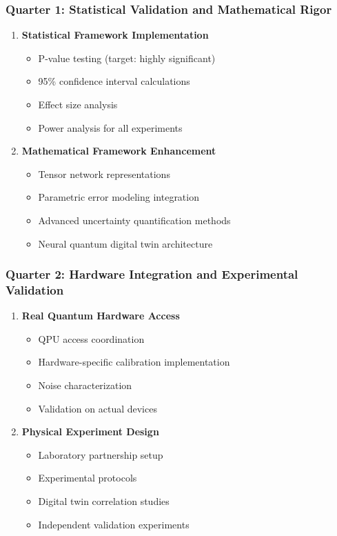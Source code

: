 \documentclass[12pt,a4paper]{article}
\begin{document}
\subsubsection{Quarter 1: Statistical Validation and Mathematical Rigor}
\begin{enumerate}
    \item \textbf{Statistical Framework Implementation}
    \begin{itemize}
        \item P-value testing (target: highly significant)
        \item 95\% confidence interval calculations
        \item Effect size analysis
        \item Power analysis for all experiments
    \end{itemize}
    
    \item \textbf{Mathematical Framework Enhancement}
    \begin{itemize}
        \item Tensor network representations
        \item Parametric error modeling integration
        \item Advanced uncertainty quantification methods
        \item Neural quantum digital twin architecture
    \end{itemize}
\end{enumerate}

\subsubsection{Quarter 2: Hardware Integration and Experimental Validation}
\begin{enumerate}
    \item \textbf{Real Quantum Hardware Access}
    \begin{itemize}
        \item QPU access coordination
        \item Hardware-specific calibration implementation
        \item Noise characterization
        \item Validation on actual devices
    \end{itemize}
    
    \item \textbf{Physical Experiment Design}
    \begin{itemize}
        \item Laboratory partnership setup
        \item Experimental protocols
        \item Digital twin correlation studies
        \item Independent validation experiments
    \end{itemize}
\end{enumerate}
\end{document}
